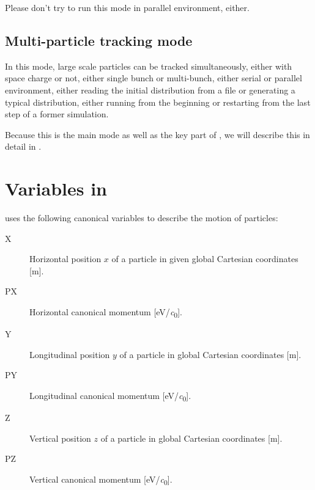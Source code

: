Please don't try to run this mode in parallel environment, either.


\subsection{Multi-particle tracking mode}

  In this mode, large scale particles can be tracked simultaneously, either with space charge or not,
  either single bunch or multi-bunch, either serial or parallel environment,
  either reading the initial distribution from a file or generating a typical distribution,
  either running from the beginning or restarting from the last step of a former simulation.

  Because this is the main mode as well as the key part of \opalcycl,
  we will describe this in detail in .




\section{Variables in \opalcycl}
\label{sec:variablesopalcycl}

\label{sec:opalcycl:canon}

\opalcycl uses the following canonical variables to describe the motion of particles:

\begin{description}
\item[X]
  Horizontal position $x$ of a particle in given global Cartesian coordinates [\si{\meter}].

\item[PX]
  Horizontal canonical momentum [\si{\electronvolt/\clight}].

\item[Y]
  Longitudinal position $y$ of a particle in global Cartesian coordinates [\si{\meter}].

\item[PY]
  Longitudinal canonical momentum [\si{\electronvolt/\clight}].

\item[Z]
  Vertical position $z$ of a particle in global Cartesian coordinates [\si{\meter}].

\item[PZ]
  Vertical canonical momentum [\si{\electronvolt/\clight}].

\end{description}

